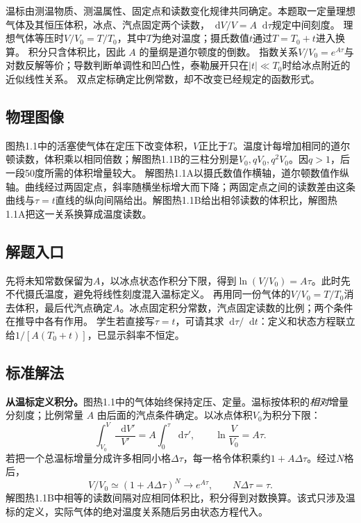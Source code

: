 \documentclass[UTF8,fontset=fandol,a4paper,11pt]{ctexart}
\newcommand{\dd}{\mathop{}\!\mathrm{d}}
\begin{document}
温标由测温物质、测温属性、固定点和读数变化规律共同确定。本题取一定量理想气体及其恒压体积，冰点、汽点固定两个读数，$\dd V/V=A\dd\tau$规定中间刻度。
理想气体等压时$V/V_0=T/T_0$，其中$T$为绝对温度；摄氏数值$t$通过$T=T_0+t$进入换算。
积分只含体积比，因此 $A$ 的量纲是道尔顿度的倒数。
指数关系$V/V_0=e^{A\tau}$与对数反解等价；导数判断单调性和凹凸性，泰勒展开只在$|t|\ll T_0$时给冰点附近的近似线性关系。
双点定标确定比例常数，却不改变已经规定的函数形式。



\subsection*{物理图像}

图热1.1中的活塞使气体在定压下改变体积，$V$正比于$T$。温度计每增加相同的道尔顿读数，体积乘以相同倍数；解图热1.1B的三柱分别是$V_0,qV_0,q^2V_0$。因$q>1$，后一段50度所需的体积增量较大。
解图热1.1A以摄氏数值作横轴，道尔顿数值作纵轴。曲线经过两固定点，斜率随横坐标增大而下降；两固定点之间的读数差由这条曲线与$\tau=t$直线的纵向间隔给出。解图热1.1B给出相邻读数的体积比，解图热1.1A把这一关系换算成温度读数。



\subsection*{解题入口}

先将未知常数保留为$A$，以冰点状态作积分下限，得到$\ln(V/V_0)=A\tau$。此时先不代摄氏温度，避免将线性刻度混入温标定义。
再用同一份气体的$V/V_0=T/T_0$消去体积，最后代汽点确定$A$。冰点固定积分常数，汽点固定读数的比例；两个条件在推导中各有作用。
学生若直接写$\tau=t$，可请其求$\dd\tau/\dd t$：定义和状态方程联立给$1/[A(T_0+t)]$，已显示斜率不恒定。



\subsection*{标准解法}

\textbf{从温标定义积分。}图热1.1中的气体始终保持定压、定量。温标按体积的\emph{相对}增量分刻度；比例常量 $A$ 由后面的汽点条件确定。以冰点体积$V_0$为积分下限：
\[\int_{V_0}^{V}\frac{\dd V'}{V'}=A\int_0^\tau\dd\tau',\qquad
\ln\frac{V}{V_0}=A\tau.\]
若把一个总温标增量分成许多相同小格$\Delta\tau$，每一格令体积乘约$1+A\Delta\tau$。经过$N$格后，
\[V/V_0\simeq(1+A\Delta\tau)^N
\longrightarrow e^{A\tau},\qquad N\Delta\tau=\tau.\]
解图热1.1B中相等的读数间隔对应相同体积比，积分得到对数换算。该式只涉及温标的定义，实际气体的绝对温度关系随后另由状态方程代入。
\end{document}
